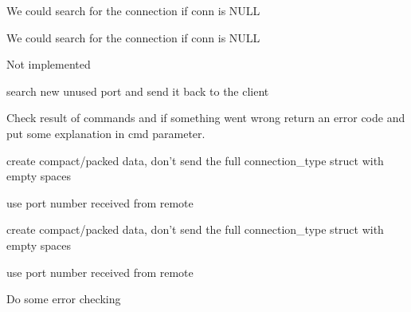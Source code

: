 
\begin{DoxyRefList}
\item[\label{todo__todo000003}%
\hypertarget{todo__todo000003}{}%
Global \hyperlink{auth_8c_ace9ba5254e71e8213c296146d3362567}{auth\-Set} (connection\-\_\-type $\ast$conn, char $\ast$buff, int size)]We could search for the connection if conn is N\-U\-L\-L  
\item[\label{todo__todo000002}%
\hypertarget{todo__todo000002}{}%
Global \hyperlink{auth_8c_af4509f52b636ad431f6430d6485a16c8}{auth\-Test} (connection\-\_\-type $\ast$conn, char $\ast$buff, int size)]We could search for the connection if conn is N\-U\-L\-L  
\item[\label{todo__todo000008}%
\hypertarget{todo__todo000008}{}%
Global \hyperlink{inout_8c_a6f875afcff66d59c2f2cf2c4587164d8}{calculate\-\_\-weights} (connection\-\_\-type $\ast$conn)]Not implemented  
\item[\label{todo__todo000007}%
\hypertarget{todo__todo000007}{}%
Global \hyperlink{inout_8c_a1b2a26c6ac333259fc57aa47c3e7c299}{conn\-\_\-mirror} (connection\-\_\-type $\ast$dst, connection\-\_\-type $\ast$src)]search new unused port and send it back to the client  
\item[\label{todo__todo000004}%
\hypertarget{todo__todo000004}{}%
Global \hyperlink{cli_8c_ad277b46a2c0363cc077beb9f9d41e6d2}{exec\-\_\-cmd} (char $\ast$cmd, int sock, struct sockaddr $\ast$client, unsigned int csize)]Check result of commands and if something went wrong return an error code and put some explanation in cmd parameter. 
\item[\label{todo__todo000005}%
\hypertarget{todo__todo000005}{}%
Global \hyperlink{command_8c_ab2b8fd2c85bbe180c1b53a5c2318b89b}{replicate\-\_\-connection} (connection\-\_\-type $\ast$conn)]create compact/packed data, don't send the full connection\-\_\-type struct with empty spaces 

use port number received from remote  
\item[\label{todo__todo000005}%
\hypertarget{todo__todo000005}{}%
Global \hyperlink{command_8c_ab2b8fd2c85bbe180c1b53a5c2318b89b}{replicate\-\_\-connection} (connection\-\_\-type $\ast$conn)]create compact/packed data, don't send the full connection\-\_\-type struct with empty spaces 

use port number received from remote  
\item[\label{todo__todo000001}%
\hypertarget{todo__todo000001}{}%
Global \hyperlink{auth_8c_a10171dc5f22d94862ab487f234cd79ea}{sha256} (char $\ast$buff, int size, char $\ast$key, int keysize, char $\ast$out, int $\ast$outsize)]Do some error checking 
\end{DoxyRefList}